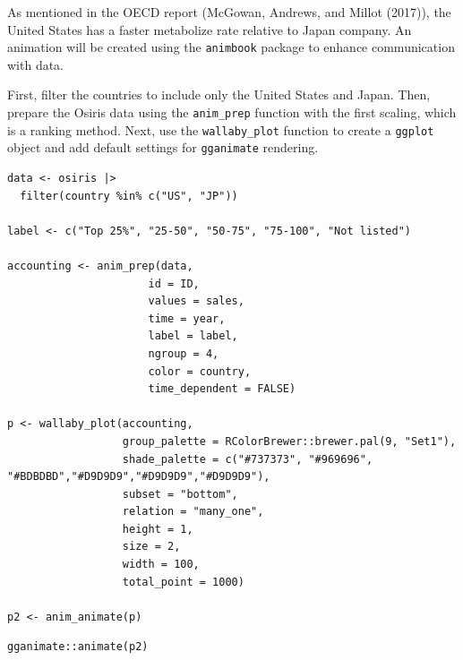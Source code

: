As mentioned in the OECD report (McGowan, Andrews, and Millot (2017)), the United States has a faster metabolize rate relative to Japan company. An animation will be created using the \texttt{animbook} package to enhance communication with data.

First, filter the countries to include only the United States and Japan. Then, prepare the Osiris data using the \texttt{anim\_prep} function with the first scaling, which is a ranking method. Next, use the \texttt{wallaby\_plot} function to create a \texttt{ggplot} object and add default settings for \texttt{gganimate} rendering.

\begin{verbatim}
data <- osiris |> 
  filter(country %in% c("US", "JP"))

label <- c("Top 25%", "25-50", "50-75", "75-100", "Not listed")

accounting <- anim_prep(data, 
                      id = ID, 
                      values = sales, 
                      time = year, 
                      label = label, 
                      ngroup = 4, 
                      color = country, 
                      time_dependent = FALSE)

p <- wallaby_plot(accounting,
                  group_palette = RColorBrewer::brewer.pal(9, "Set1"),
                  shade_palette = c("#737373", "#969696", "#BDBDBD","#D9D9D9","#D9D9D9","#D9D9D9"),
                  subset = "bottom",
                  relation = "many_one",
                  height = 1,
                  size = 2,
                  width = 100,
                  total_point = 1000)

p2 <- anim_animate(p)
\end{verbatim}

\begin{verbatim}
gganimate::animate(p2)
\end{verbatim}

